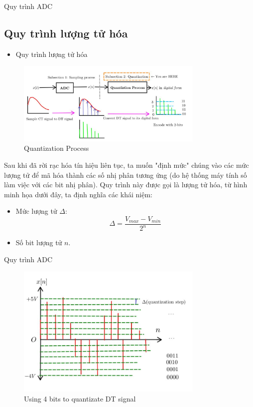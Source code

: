 \documentclass[8pt]{beamer}
\begin{document}
\begin{frame}{Quy trình ADC}
	\subsection{Quy trình lượng tử hóa}
\begin{itemize}
	\item Quy trình lượng tử hóa
\end{itemize}
\begin{figure}[h]
			\includegraphics[width=0.8\textwidth]{5.jpg}
			\caption{Quantization Process}			\label{fig:re6}
		\end{figure}
		Sau khi đã rời rạc hóa tín hiệu liên tục, ta muốn "định mức" chúng vào các mức lượng tử để mã hóa thành các số nhị phân tương ứng (do hệ thống máy tính số làm việc với các bit nhị phân). Quy trình này được gọi là \alert{lượng tử hóa}, từ hình minh họa dưới đây, ta định nghĩa các khái niệm:
		\begin{itemize}
			\item Mức lượng tử $\Delta$: $$\Delta=\frac{V_{max}-V_{min}}{2^{n}}$$
			\item Số bit lượng tử $n$.
		\end{itemize}
\end{frame}
\begin{frame}{Quy trình ADC}
\begin{figure}[h]
			\includegraphics[width=0.8\textwidth]{6.jpg}
			\caption{Using 4 bits to quantizate DT signal}			\label{fig:re7}
		\end{figure}
\end{frame}
\end{document}
